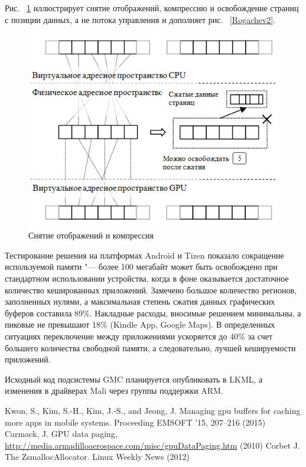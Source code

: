 \documentclass[10pt, a5paper]{article}
\begin{document}
Рис. ~\ref{Rogachev3} иллюстрирует снятие отображений, компрессию и освобождение страниц с позиции данных, а не потока управления и дополняет рис. ~\ref{Rogachev2}.

\begin{figure}[h!]
  \centering
  \includegraphics[]{18_2016_Rogachev3.png}
  \caption{Снятие отображений и компрессия}
  \label{Rogachev3}
\end{figure}

Тестирование решения на платформах Android и Tizen показало сокращение используемой памяти "--- более 100 мегабайт может быть освобождено при стандартном использовании устройства, когда в фоне оказывается достаточное количество кешированных приложений. Замечено большое количество регионов, заполненных нулями, а максимальная степень сжатия данных графических буферов составила 89\%. Накладные расходы, вносимые решением минимальны, а пиковые не превышают 18\% (Kindle App, Google Maps). В определенных ситуациях переключение между приложениями ускоряется до 40\% за счет большего количества свободной памяти, а следовательно, лучшей кешируемости приложений.

Исходный код подсистемы GMC планируется опубликовать в LKML, а изменения в драйверах Mali через группы поддержки ARM.

\begin{thebibliography}{99}
 Kwon, S., Kim, S.-H., Kim, J.-S., and Jeong, J. Managing gpu buffers for caching more apps in mobile systems. Proceeding EMSOFT '15, 207–216 (2015)
 Carmack, J. GPU data paging, \url{http://media.armadilloaerospace.com/misc/gpuDataPaging.htm} (2010)
 Corbet J. The ZsmallocAllocator. Linux Weekly News (2012)
\end{thebibliography}
\end{document}
